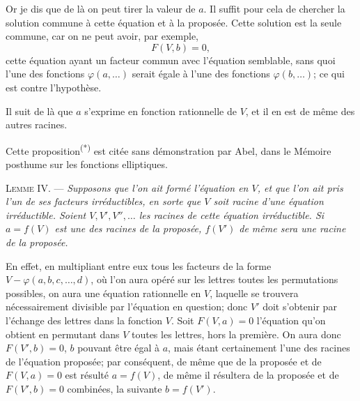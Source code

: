 
Or je dis que de là on peut tirer la valeur de $a$. Il suffit pour cela
de chercher la solution commune à cette équation et à la proposée.
Cette solution est la seule commune, car on ne peut avoir,
par exemple,
\[
F(V,b)=0,
\]
cette équation ayant un facteur commun avec l'équation semblable,
sans quoi l'une des fonctions $\varphi(a,\ldots)$ serait égale à
l'une des fonctions $\varphi(b,\ldots)$; ce qui est contre l'hypothèse.

Il suit de là que $a$ s'exprime en fonction rationnelle de $V$, et il
en est de même des autres racines.

Cette proposition\textsuperscript{(*)} est citée sans démonstration par Abel,
dans le Mémoire posthume sur les fonctions elliptiques.

\medskip
\noindent\textsc{Lemme IV.} --- \emph{Supposons que l'on ait formé l'équation en $V$,
et que l'on ait pris l'un de ses facteurs irréductibles, en sorte
que $V$ soit racine d'une équation irréductible. Soient $V,V',V'',\ldots$
les racines de cette équation irréductible. Si $a=f(V)$
est une des racines de la proposée, $f(V')$ de même sera une racine
de la proposée.}

En effet, en multipliant entre eux tous les facteurs de la forme
$V-\varphi(a,b,c,\ldots,d)$, où l'on aura opéré sur les lettres toutes
les permutations possibles, on aura une équation rationnelle en $V$,
laquelle se trouvera nécessairement divisible par l'équation en
question; donc $V'$ doit s'obtenir par l'échange des lettres dans la
fonction $V$. Soit $F(V,a)=0$ l'équation qu'on obtient en permutant
dans $V$ toutes les lettres, hors la première. On aura donc
$F(V',b)=0$, $b$ pouvant être égal à $a$, mais étant certainement
l'une des racines de l'équation proposée; par conséquent, de
même que de la proposée et de $F(V,a)=0$ est résulté $a=f(V)$,
de même il résultera de la proposée et de $F(V',b)=0$ combinées,
la suivante $b=f(V')$.

